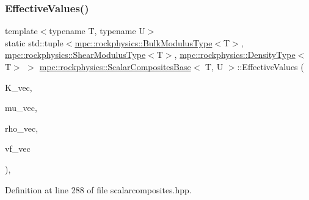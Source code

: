 \subsubsection{\texorpdfstring{Effective\+Values()}{EffectiveValues()}}
{\footnotesize\ttfamily template$<$typename T, typename U$>$ \\
static std\+::tuple$<$\mbox{\hyperlink{structmpc_1_1rockphysics_1_1_bulk_modulus_type}{mpc\+::rockphysics\+::\+Bulk\+Modulus\+Type}}$<$T$>$, \mbox{\hyperlink{structmpc_1_1rockphysics_1_1_shear_modulus_type}{mpc\+::rockphysics\+::\+Shear\+Modulus\+Type}}$<$T$>$, \mbox{\hyperlink{structmpc_1_1rockphysics_1_1_density_type}{mpc\+::rockphysics\+::\+Density\+Type}}$<$T$>$ $>$ \mbox{\hyperlink{classmpc_1_1rockphysics_1_1_scalar_composites_base}{mpc\+::rockphysics\+::\+Scalar\+Composites\+Base}}$<$ T, U $>$\+::Effective\+Values (\begin{DoxyParamCaption}\item[{const std\+::vector$<$ \mbox{\hyperlink{structmpc_1_1rockphysics_1_1_bulk_modulus_type}{mpc\+::rockphysics\+::\+Bulk\+Modulus\+Type}}$<$ T $>$ $>$ \&}]{K\+\_\+vec,  }\item[{const std\+::vector$<$ \mbox{\hyperlink{structmpc_1_1rockphysics_1_1_shear_modulus_type}{mpc\+::rockphysics\+::\+Shear\+Modulus\+Type}}$<$ T $>$ $>$ \&}]{mu\+\_\+vec,  }\item[{const std\+::vector$<$ \mbox{\hyperlink{structmpc_1_1rockphysics_1_1_density_type}{mpc\+::rockphysics\+::\+Density\+Type}}$<$ T $>$ $>$ \&}]{rho\+\_\+vec,  }\item[{const std\+::vector$<$ \mbox{\hyperlink{structmpc_1_1rockphysics_1_1_volume_fraction_type}{mpc\+::rockphysics\+::\+Volume\+Fraction\+Type}}$<$ T $>$ $>$ \&}]{vf\+\_\+vec }\end{DoxyParamCaption})\hspace{0.3cm}{\ttfamily [inline]}, {\ttfamily [static]}}



Definition at line 288 of file scalarcomposites.\+hpp.

\mbox{\label{classmpc_1_1rockphysics_1_1_scalar_composites_base_a4087bdf26403c7b739e2807524bc5596}} 

